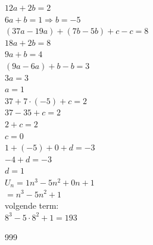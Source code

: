 \documentclass[a4paper]{article}
\begin{document}
$ 12a + 2b = 2 $ \\

$ 6a + b = 1 \Rightarrow b = -5 $ \\

$ (37a - 19a) + (7b - 5b) + c - c = 8 $ \\

$ 18a + 2b = 8 $ \\

$ 9a + b = 4 $ \\

$ (9a-6a) +b-b = 3$\\

$ 3a = 3 $ \\

$ a = 1 $ \\

$ 37 + 7 \cdot (-5) + c = 2 $ \\

$ 37 - 35 + c = 2 $ \\

$ 2 + c = 2 $ \\

$ c = 0 $ \\

$ 1 + (-5) + 0 + d = -3 $ \\

$ -4 + d = -3 $ \\
 
$ d = 1 $ \\

$ U_n = 1n^3 - 5n^2 + 0n + 1 $ \\

$ = n^3 - 5n^2 + 1 $ \\

volgende term: \\

$ 8^3 - 5 \cdot 8^2 + 1 = 193 $



\begin{thebibliography}{999}
\end{thebibliography}
\end{document}
